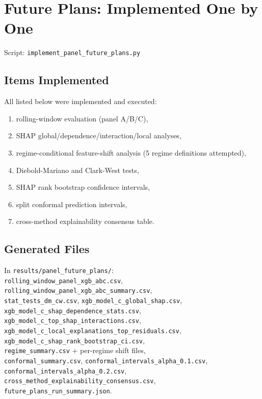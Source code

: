 \documentclass[11pt]{article}
\begin{document}
\section{Future Plans: Implemented One by One}
Script: \texttt{implement\_panel\_future\_plans.py}

\subsection{Items Implemented}
All listed below were implemented and executed:
\begin{enumerate}[leftmargin=1.2em]
  \item rolling-window evaluation (panel A/B/C),
  \item SHAP global/dependence/interaction/local analyses,
  \item regime-conditional feature-shift analysis (5 regime definitions attempted),
  \item Diebold-Mariano and Clark-West tests,
  \item SHAP rank bootstrap confidence intervals,
  \item split conformal prediction intervals,
  \item cross-method explainability consensus table.
\end{enumerate}

\subsection{Generated Files}
In \texttt{results/panel\_future\_plans/}:\\
\texttt{rolling\_window\_panel\_xgb\_abc.csv}, \texttt{rolling\_window\_panel\_xgb\_abc\_summary.csv},\\
\texttt{stat\_tests\_dm\_cw.csv}, \texttt{xgb\_model\_c\_global\_shap.csv},\\
\texttt{xgb\_model\_c\_shap\_dependence\_stats.csv}, \texttt{xgb\_model\_c\_top\_shap\_interactions.csv},\\
\texttt{xgb\_model\_c\_local\_explanations\_top\_residuals.csv}, \texttt{xgb\_model\_c\_shap\_rank\_bootstrap\_ci.csv},\\
\texttt{regime\_summary.csv} + per-regime shift files,\\
\texttt{conformal\_summary.csv}, \texttt{conformal\_intervals\_alpha\_0.1.csv}, \texttt{conformal\_intervals\_alpha\_0.2.csv},\\
\texttt{cross\_method\_explainability\_consensus.csv}, \texttt{future\_plans\_run\_summary.json}.
\end{document}

